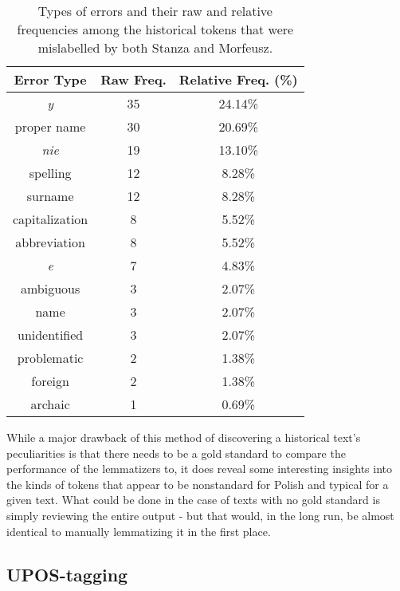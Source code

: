 \renewcommand{\arraystretch}{1.25}
\begin{table}[h]
\begin{center}
\begin{tabular}{|c|cc|}
\hline \bf Error Type & \bf Raw Freq. & \bf Relative Freq. (\%) \\ \hline
\textit{y} & 35 & 24.14\%  \\
proper name & 30 & 20.69\%  \\
\textit{nie} & 19 & 13.10\%  \\
spelling & 12 & 8.28\% \\ 
surname & 12 & 8.28\% \\
capitalization & 8 & 5.52\% \\
abbreviation & 8 & 5.52\% \\
\textit{e} & 7 & 4.83\% \\
ambiguous & 3 & 2.07\% \\
name & 3 & 2.07\% \\
unidentified & 3 & 2.07\% \\
problematic & 2 & 1.38\% \\
foreign & 2 & 1.38\% \\
archaic & 1 & 0.69\% \\
\hline
\end{tabular}
\caption{\label{table:lemmas-errors} Types of errors and their raw and relative frequencies among the historical tokens that were mislabelled by both Stanza and Morfeusz.}
\end{center}
\end{table}

While a major drawback of this method of discovering a historical text's peculiarities is that there needs to be a gold standard to compare the performance of the lemmatizers to, it does reveal some interesting insights into the kinds of tokens that appear to be nonstandard for Polish and typical for a given text. What could be done in the case of texts with no gold standard is simply reviewing the entire output - but that would, in the long run, be almost identical to manually lemmatizing it in the first place.

\subsection{UPOS-tagging}
\label{subsec:upos-tagging}

